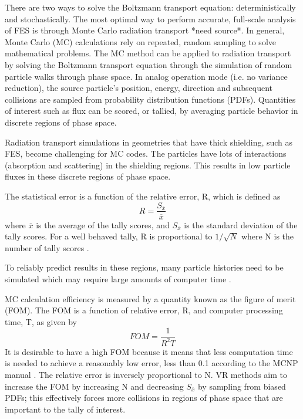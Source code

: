 There are two ways to solve the Boltzmann transport equation: deterministically
and stochastically.
The most optimal way to perform accurate, full-scale analysis of FES is
through Monte Carlo radiation transport *need source*.
In general, Monte Carlo (MC) calculations rely on repeated, random sampling to solve
mathematical problems.  The MC method can be applied to radiation transport by
solving the Boltzmann transport equation through the simulation of random particle
walks through phase space.  In analog operation mode (i.e. no variance reduction), 
the source particle's position, energy, direction
and subsequent collisions are sampled from probability
distribution functions (PDFs).  Quantities of interest such as flux can be
scored, or tallied, by averaging particle behavior
in discrete regions of phase space.

Radiation transport simulations in geometries that have thick shielding, such as
FES, become challenging for MC codes.  The particles have lots of interactions
(absorption and scattering) in the shielding regions.  This results in low
particle fluxes in these discrete regions of phase space.  

The statistical error is a function of the relative error, R, which is defined as
\begin{equation} \label{eq:1.2}
		R = \frac{S_{\overline{x}}}{{\overline{x}}}
\end{equation}
where $\overline{x}$ is the average of the tally scores, and $S_{\overline{x}}$ is the standard
deviation of the tally scores.  For a well behaved tally, R is proportional
to $1/\sqrt{N}$ where N is the number of tally scores \cite{mcnp_manual}.

To reliably predict results in these regions, many particle
histories need to be simulated which may require large amounts of computer time
\cite{haghighat_wagner_2003}.

MC calculation efficiency is measured by a quantity known as the figure of merit
(FOM).  The FOM is a function of relative error, R, and computer processing
time, T, 
as given by
\begin{equation} \label{eq:1.3}
		FOM = \frac{1}{{{R^2}T}}
\end{equation}
It is desirable to have a high FOM because it means that less computation time is needed to achieve
a reasonably low error, less than 0.1 according to the MCNP manual
\cite{mcnp_manual}. 
The relative error is inversely proportional to N.
VR methods
aim to increase the FOM by increasing N and decreasing $S_{\overline{x}}$ by sampling from biased PDFs; this effectively
forces more collisions in regions of phase space that are
important to the tally of interest. 


